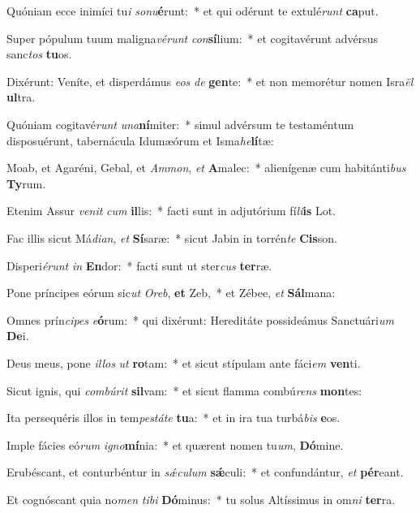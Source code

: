 \item Quóniam ecce inimíci tu\textit{i} \textit{so}\textit{nu}\textbf{é}runt:~* et qui odérunt te extulé\textit{runt} \textbf{ca}put.
\item Super pópulum tuum maligna\textit{vé}\textit{runt} \textit{con}\textbf{sí}lium:~* et cogitavérunt advérsus sanc\textit{tos} \textbf{tu}os.
\item Dixérunt: Veníte, et disperdámus \textit{e}\textit{os} \textit{de} \textbf{gen}te:~* et non memorétur nomen Isra\textit{ël} \textbf{ul}tra.
\item Quóniam cogitavé\textit{runt} \textit{u}\textit{na}\textbf{ní}miter:~* simul advérsum te testaméntum disposuérunt, tabernácula Idumæórum et Isma\textit{he}\textbf{lí}tæ:
\item Moab, et Agaréni, Gebal, et \textit{Am}\textit{mon}, \textit{et} \textbf{A}malec:~* alienígenæ cum habitánti\textit{bus} \textbf{Ty}rum.
\item Etenim Assur \textit{ve}\textit{nit} \textit{cum} \textbf{il}lis:~* facti sunt in adjutórium fí\textit{li}\textbf{is} Lot.
\item Fac illis sicut Má\textit{di}\textit{an}, \textit{et} \textbf{Sí}saræ:~* sicut Jabin in torrén\textit{te} \textbf{Cis}son.
\item Disperi\textit{é}\textit{runt} \textit{in} \textbf{En}dor:~* facti sunt ut ster\textit{cus} \textbf{ter}ræ.
\item Pone príncipes eórum sic\textit{ut} \textit{O}\textit{reb}, \textbf{et} Zeb,~* et Zébee, \textit{et} \textbf{Sál}mana:
\item Omnes prín\textit{ci}\textit{pes} \textit{e}\textbf{ó}rum:~* qui dixérunt: Hereditáte possideámus Sanctuári\textit{um} \textbf{De}i.
\item Deus meus, pone \textit{il}\textit{los} \textit{ut} \textbf{ro}tam:~* et sicut stípulam ante fáci\textit{em} \textbf{ven}ti.
\item Sicut ignis, qui \textit{com}\textit{bú}\textit{rit} \textbf{sil}vam:~* et sicut flamma combú\textit{rens} \textbf{mon}tes:
\item Ita persequéris illos in tem\textit{pes}\textit{tá}\textit{te} \textbf{tu}a:~* et in ira tua turbá\textit{bis} \textbf{e}os.
\item Imple fácies eó\textit{rum} \textit{i}\textit{gno}\textbf{mí}nia:~* et quærent nomen tu\textit{um}, \textbf{Dó}mine.
\item Erubéscant, et conturbéntur in \textit{sǽ}\textit{cu}\textit{lum} \textbf{sǽ}culi:~* et confundántur, \textit{et} \textbf{pér}eant.
\item Et cognóscant quia no\textit{men} \textit{ti}\textit{bi} \textbf{Dó}minus:~* tu solus Altíssimus in om\textit{ni} \textbf{ter}ra.
